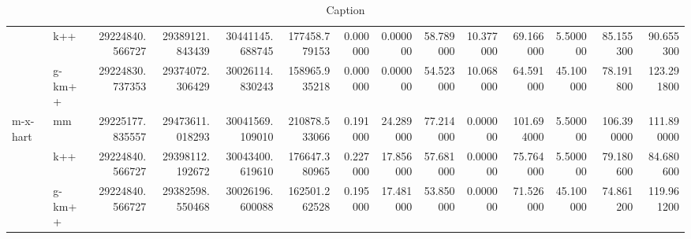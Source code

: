 \begin{table}[!ht]
{\begin{tabular}{llrrrrrrrrrrrr}
 & k++ & 29224840.566727 & 29389121.843439 & 30441145.688745 & 177458.779153 & 0.000000 & 0.000000 & 58.789000 & 10.377000 & 69.166000 & 5.500000 & 85.155300 & 90.655300 \\
 & g-km++ & 29224830.737353 & 29374072.306429 & 30026114.830243 & 158965.935218 & 0.000000 & 0.000000 & 54.523000 & 10.068000 & 64.591000 & 45.100000 & 78.191800 & 123.291800 \\
\cline{1-14}
\multirow[t]{3}{*}{m-x-hart} & mm & 29225177.835557 & 29473611.018293 & 30041569.109010 & 210878.533066 & 0.191000 & 24.289000 & 77.214000 & 0.000000 & 101.694000 & 5.500000 & 106.390000 & 111.890000 \\
 & k++ & 29224840.566727 & 29398112.192672 & 30043400.619610 & 176647.380965 & 0.227000 & 17.856000 & 57.681000 & 0.000000 & 75.764000 & 5.500000 & 79.180600 & 84.680600 \\
 & g-km++ & 29224840.566727 & 29382598.550468 & 30026196.600088 & 162501.262528 & 0.195000 & 17.481000 & 53.850000 & 0.000000 & 71.526000 & 45.100000 & 74.861200 & 119.961200 \\
\cline{1-14}
\hline
\end{tabular}
}

\caption{Caption}
\label{tab:my_label}
\end{table}